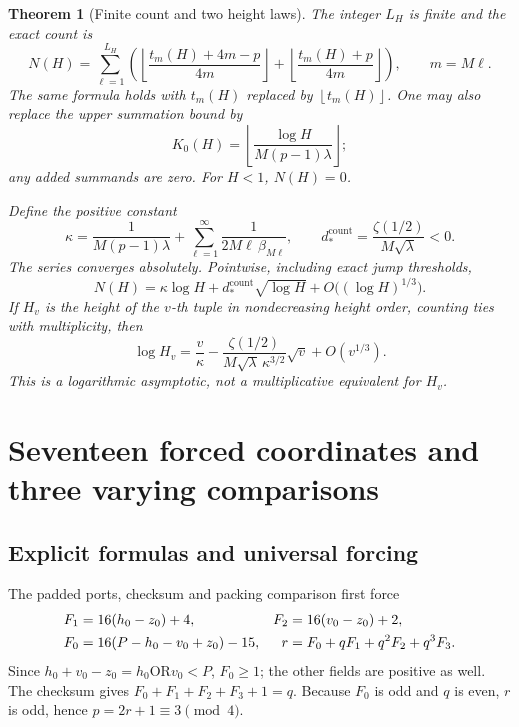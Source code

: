 \documentclass[11pt,letterpaper]{article}
\newtheorem{theorem}{Theorem}[section]
\theoremstyle{definition}\newtheorem{definition}[theorem]{Definition}
\theoremstyle{remark}\newtheorem{remark}[theorem]{Remark}
\newcommand{\OR}{\mathbin{\mathrm{OR}}}
\newcommand{\floor}[1]{\left\lfloor #1\right\rfloor}
\begin{document}
\begin{theorem}[Finite count and two height laws]\label{fup:nf:thm:count}
The integer $L_H$ is finite and the exact count is
\begin{equation}\label{fup:nf:eq:count}
 N(H)=\sum_{\ell=1}^{L_H}\left(
 \floor{\frac{t_m(H)+4m-p}{4m}}+
 \floor{\frac{t_m(H)+p}{4m}}\right),\qquad m=M\ell.
\end{equation}
The same formula holds with $t_m(H)$ replaced by $\floor{t_m(H)}$. One may also replace the upper summation bound by
\begin{equation}\label{fup:nf:eq:explicitcut}
 K_0(H)=\floor{\frac{\log H}{M(p-1)\lambda}};
\end{equation}
any added summands are zero. For $H<1$, $N(H)=0$.

Define the positive constant
\begin{equation}\label{fup:nf:eq:kappa}
 \kappa=\frac{1}{M(p-1)\lambda}
      +\sum_{\ell=1}^{\infty}\frac{1}{2M\ell\,\beta_{M\ell}},
 \qquad d_*^{\mathrm{count}}=\frac{\zeta(1/2)}{M\sqrt\lambda}<0.
\end{equation}
The series converges absolutely. Pointwise, including exact jump thresholds,
\begin{equation}\label{fup:nf:eq:asymptotic}
 N(H)=\kappa\log H+d_*^{\mathrm{count}}\sqrt{\log H}
       +O\bigl((\log H)^{1/3}\bigr).
\end{equation}
If $H_v$ is the height of the $v$-th tuple in nondecreasing height order, counting ties with multiplicity, then
\begin{equation}\label{fup:nf:eq:inverse}
 \log H_v=\frac v\kappa-
 \frac{\zeta(1/2)}{M\sqrt\lambda\,\kappa^{3/2}}\sqrt v
 +O(v^{1/3}).
\end{equation}
This is a logarithmic asymptotic, not a multiplicative equivalent for $H_v$.
\end{theorem}

\section{Seventeen forced coordinates and three varying comparisons}\label{fup:nf:sec:forced}
\subsection{Explicit formulas and universal forcing}
The padded ports, checksum and packing comparison first force
\begin{align}\label{fup:nf:eq:fields}
 F_1&=16(h_0-z_0)+4,&F_2&=16(v_0-z_0)+2,\notag\\
 F_0&=16(P-h_0-v_0+z_0)-15,&
 r&=F_0+qF_1+q^2F_2+q^3F_3.
\end{align}
Since $h_0+v_0-z_0=h_0\OR v_0<P$, $F_0\ge1$; the other fields are positive as well. The checksum gives $F_0+F_1+F_2+F_3+1=q$. Because $F_0$ is odd and $q$ is even, $r$ is odd, hence $p=2r+1\equiv3\pmod4$.
\end{document}
